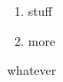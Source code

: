 \documentclass{article}
\begin{document}
\begin{enumerate}
\item stuff
\item more

\end{enumerate}

\begin{center}
\LARGE whatever
\end{center}
\end{document}
